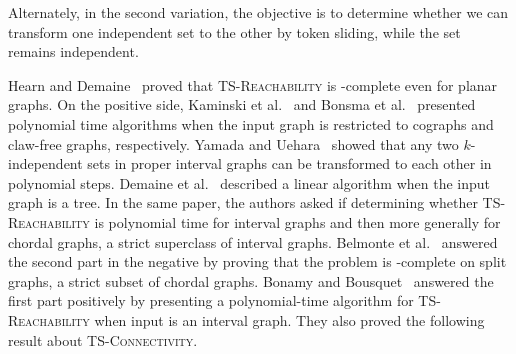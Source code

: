 

\noindent 
Alternately, in the second variation, the objective is to determine whether
we can transform one independent set to the other by 
token sliding, while the set remains independent.

Hearn and Demaine~\cite
{DBLP:journals/tcs/HearnD05} proved  
that \textsc{TS-Reachability}
is \PSPACE-complete even for planar graphs. 
On the positive side, Kaminski et al.~\cite{DBLP:journals/tcs/KaminskiMM12} and Bonsma et al.~\cite{DBLP:journals/mst/BelmonteKLMOS21} presented polynomial time algorithms 
when the input graph is restricted to cographs and claw-free graphs,
respectively.
Yamada and Uehara~\cite{DBLP:conf/walcom/YamadaU16} showed that any 
two $k$-independent sets
in proper interval graphs can be transformed to each other 
in polynomial steps.
Demaine et al.~\cite{DBLP:conf/isaac/DemaineDFHIOOUY14} described a linear algorithm when
the input graph is a tree.
In the same paper, the authors asked if determining whether 
\textsc{TS-Reachability} is polynomial time for 
interval graphs and then more generally for chordal graphs, 
a strict superclass of interval graphs. 
Belmonte et al.~\cite{DBLP:journals/mst/BelmonteKLMOS21} answered the second
part in the negative by proving that the problem is 
\PSPACE-complete on split graphs, a strict subset
of chordal graphs.
Bonamy and Bousquet~\cite{DBLP:conf/wg/BonamyB17} answered 
the first part 
positively by presenting a polynomial-time 
algorithm for \textsc{TS-Reachability} when input is an
interval graph.
They also proved the following result about  
\textsc{TS-Connectivity}.

